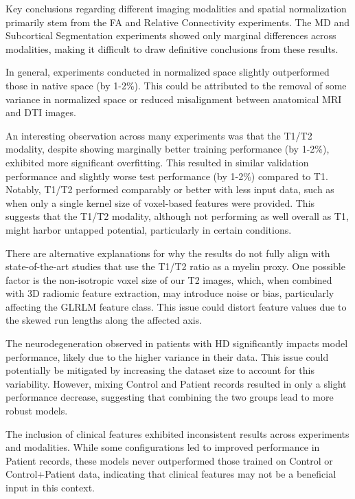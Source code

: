 Key conclusions regarding different imaging modalities and spatial normalization primarily stem from the \ac{FA} and Relative Connectivity experiments. The \ac{MD} and Subcortical Segmentation experiments showed only marginal differences across modalities, making it difficult to draw definitive conclusions from these results.\par
In general, experiments conducted in normalized space slightly outperformed those in native space (by 1-2\%). This could be attributed to the removal of some variance in normalized space or reduced misalignment between anatomical \ac{MRI} and \ac{DTI} images.\par
An interesting observation across many experiments was that the T1/T2 modality, despite showing marginally better training performance (by 1-2\%), exhibited more significant overfitting. This resulted in similar validation performance and slightly worse test performance (by 1-2\%) compared to T1. Notably, T1/T2 performed comparably or better with less input data, such as when only a single kernel size of voxel-based features were provided. This suggests that the T1/T2 modality, although not performing as well overall as T1, might harbor untapped potential, particularly in certain conditions.\par
There are alternative explanations for why the results do not fully align with state-of-the-art studies that use the T1/T2 ratio as a myelin proxy. One possible factor is the non-isotropic voxel size of our T2 images, which, when combined with 3D radiomic feature extraction, may introduce noise or bias, particularly affecting the \ac{GLRLM} feature class. This issue could distort feature values due to the skewed run lengths along the affected axis.\par
The neurodegeneration observed in patients with \ac{HD} significantly impacts model performance, likely due to the higher variance in their data. This issue could potentially be mitigated by increasing the dataset size to account for this variability. However, mixing Control and Patient records resulted in only a slight performance decrease, suggesting that combining the two groups lead to more robust models.\par
The inclusion of clinical features exhibited inconsistent results across experiments and modalities. While some configurations led to improved performance in Patient records, these models never outperformed those trained on Control or Control+Patient data, indicating that clinical features may not be a beneficial input in this context.\par

